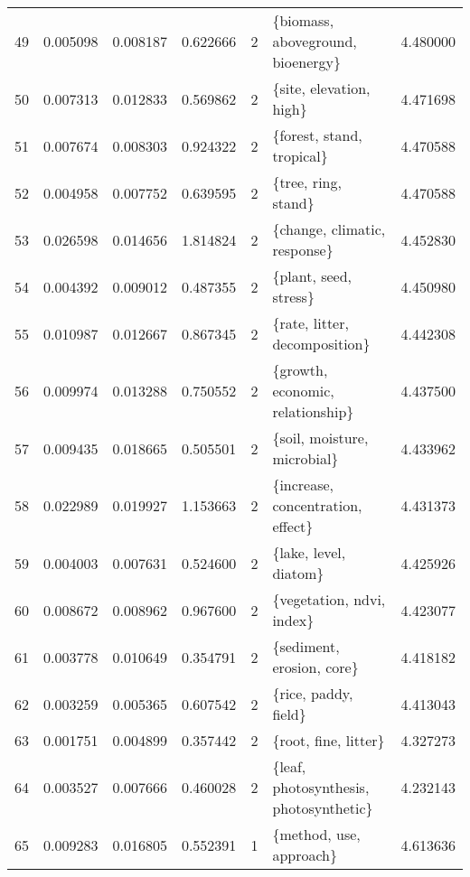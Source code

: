 \begin{tabular}{lrrrrlr}
49 &    0.005098 &  0.008187 &        0.622666 &           2 &       \{biomass, aboveground, bioenergy\} &  4.480000 \\
50 &    0.007313 &  0.012833 &        0.569862 &           2 &                 \{site, elevation, high\} &  4.471698 \\
51 &    0.007674 &  0.008303 &        0.924322 &           2 &               \{forest, stand, tropical\} &  4.470588 \\
52 &    0.004958 &  0.007752 &        0.639595 &           2 &                     \{tree, ring, stand\} &  4.470588 \\
53 &    0.026598 &  0.014656 &        1.814824 &           2 &            \{change, climatic, response\} &  4.452830 \\
54 &    0.004392 &  0.009012 &        0.487355 &           2 &                   \{plant, seed, stress\} &  4.450980 \\
55 &    0.010987 &  0.012667 &        0.867345 &           2 &           \{rate, litter, decomposition\} &  4.442308 \\
56 &    0.009974 &  0.013288 &        0.750552 &           2 &        \{growth, economic, relationship\} &  4.437500 \\
57 &    0.009435 &  0.018665 &        0.505501 &           2 &             \{soil, moisture, microbial\} &  4.433962 \\
58 &    0.022989 &  0.019927 &        1.153663 &           2 &       \{increase, concentration, effect\} &  4.431373 \\
59 &    0.004003 &  0.007631 &        0.524600 &           2 &                   \{lake, level, diatom\} &  4.425926 \\
60 &    0.008672 &  0.008962 &        0.967600 &           2 &               \{vegetation, ndvi, index\} &  4.423077 \\
61 &    0.003778 &  0.010649 &        0.354791 &           2 &               \{sediment, erosion, core\} &  4.418182 \\
62 &    0.003259 &  0.005365 &        0.607542 &           2 &                    \{rice, paddy, field\} &  4.413043 \\
63 &    0.001751 &  0.004899 &        0.357442 &           2 &                    \{root, fine, litter\} &  4.327273 \\
64 &    0.003527 &  0.007666 &        0.460028 &           2 &  \{leaf, photosynthesis, photosynthetic\} &  4.232143 \\
65 &    0.009283 &  0.016805 &        0.552391 &           1 &                 \{method, use, approach\} &  4.613636 \\

\end{tabular}
